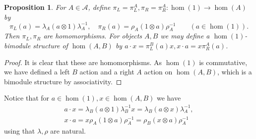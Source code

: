 \documentclass[a4paper,11pt]{article}
\theoremstyle{plain}
\newtheorem{proposition}{Proposition}[section]
\newtheorem{lemma}[proposition]{Lemma}
\theoremstyle{remark}
\newcommand{\mc}[1]{\mathcal{#1}}
\begin{document}


\begin{proposition}
For $A\in\mc A$, define $\pi_L = \pi^A_L, \pi_R = \pi^A_R \colon \hom(1) \to \hom(A)$ by
\[ \pi_L(a) = \lambda_A (a\otimes 1)\lambda_A^{-1},
\quad \pi_R(a) = \rho_A (1\otimes a)\rho_A^{-1}
\qquad (a\in \hom(1)). \]
Then $\pi_L, \pi_R$ are homomorphisms.  For objects $A,B$ we may define a $\hom(1)$-bimodule structure of $\hom(A,B)$ by $a\cdot x = \pi^B_L(a)x, x\cdot a = x \pi^A_R(a)$.
\end{proposition}
\begin{proof}
It is clear that these are homomorphisms.  As $\hom(1)$ is commutative, we have defined a left $B$ action and a right $A$ action on $\hom(A,B)$, which is a bimodule structure by associativity.
\end{proof}

Notice that for $a\in\hom(1), x\in\hom(A,B)$ we have
\begin{gather*}
a\cdot x = \lambda_B(a\otimes 1)\lambda_B^{-1}x = \lambda_B(a\otimes x)\lambda_A^{-1},   \\
x\cdot a = x \rho_A(1\otimes a)\rho_A^{-1} = \rho_B(x\otimes a)\rho_A^{-1}
\end{gather*}
using that $\lambda, \rho$ are natural.
\end{document}
